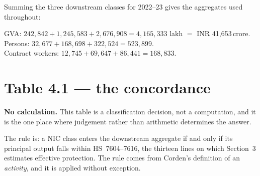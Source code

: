 \documentclass[11pt, a4paper]{article}
\newcommand{\cro}{\,\textrm{crore}}
\begin{document}
\noindent Summing the three downstream classes for 2022--23 gives the aggregates used
throughout:

\begin{table}[H]
\centering
\small
{}
\end{table}

\begin{work}
GVA: $242{,}842 + 1{,}245{,}583 + 2{,}676{,}908 = 4{,}165{,}333$ lakh $=$ INR
41{,}653\cro. \\
Persons: $32{,}677 + 168{,}698 + 322{,}524 = 523{,}899$. \\
Contract workers: $12{,}745 + 69{,}647 + 86{,}441 = 168{,}833$.
\end{work}

\newpage
\section{Table 4.1 --- the concordance}

\textbf{No calculation.} This table is a classification decision, not a computation,
and it is the one place where judgement rather than arithmetic determines the answer.

The rule is: a NIC class enters the downstream aggregate if and only if its principal
output falls within HS~7604--7616, the thirteen lines on which Section~3 estimates
effective protection. The rule comes from Corden's definition of an
\emph{activity}, and it is applied without exception.
\end{document}
